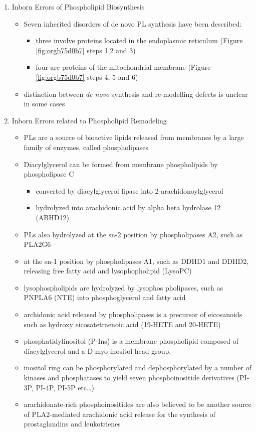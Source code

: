 \documentclass{scrartcl}
\begin{document}
\begin{enumerate}
\item Inborn Errors of Phospholipid Biosynthesis
\label{sec:orgfdfc599}
\begin{itemize}
\item Seven inherited disorders of de novo PL synthesis have been described:
\begin{itemize}
\item three involve proteins located in the endoplasmic reticulum
(Figure \ref{fig:orgb75d0b7} steps 1,2 and 3)
\item four are proteins of the mitochondrial membrane (Figure
\ref{fig:orgb75d0b7} steps 4, 5 and 6)
\end{itemize}
\item distinction between \emph{de novo} synthesis and re-modelling defects is
unclear in some cases
\end{itemize}

\item Inborn Errors related to Phospholipid Remodeling
\label{sec:org51af65f}
\begin{itemize}
\item PLs are a source of bioactive lipids released from
membranes by a large family of enzymes, called phospholipases
\item Diacylglycerol can be formed from membrane phospholipids by
phospholipase C
\begin{itemize}
\item converted by diacylglycerol lipase into 2-arachidonoylglycerol
\item hydrolyzed into arachidonic acid by alpha beta hydrolase 12 (ABHD12)
\end{itemize}
\item PLs also hydrolyzed at the sn-2 position by phospholipases A2, such
as PLA2G6
\item at the sn-1 position by phospholipases A1, such as DDHD1 and DDHD2,
releasing free fatty acid and lysophopholipid
(LysoPC)
\item lysophospholipids are hydrolyzed by lysophos pholipases, such as
PNPLA6 (NTE) into phosphoglycerol and fatty acid
\item archidonic acid released by phospholipases is a precursor of eicosanoids such as
hydroxy eicosatetraenoic acid (19-HETE and 20-HETE)
\item phosphatidylinositol (P-Ins) is a membrane phospholipid composed of
diacylglycerol and a D-myo-inositol head group.
\item inositol ring can be phosphorylated and dephosphorylated by a number
of kinases and phosphatases to yield seven phosphoinositide
derivatives (PI-3P, PI-4P, PI-5P etc\ldots{})
\item arachidonate-rich phosphoinositides are also believed to be another
source of PLA2-mediated arachidonic acid release for the synthesis
of prostaglandins and leukotrienes
\end{itemize}
\end{enumerate}
\end{document}
